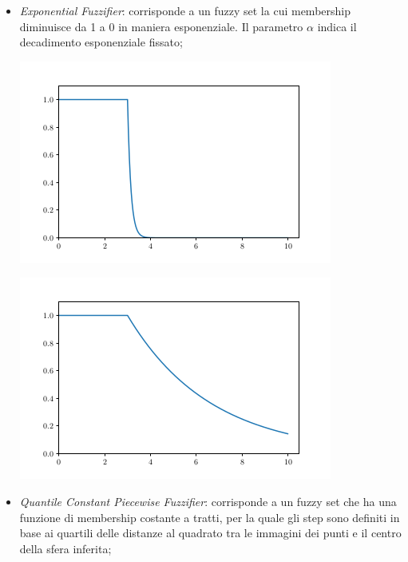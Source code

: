\documentclass[12pt,a4paper]{report}
\begin{document}
\begin{itemize}
\item \emph{Exponential Fuzzifier}: corrisponde a un fuzzy set la cui  membership diminuisce da 1 a 0 in maniera esponenziale. Il parametro $\alpha$ indica il decadimento esponenziale fissato;

\begin{minipage}{\linewidth}
	\centering
       \includegraphics[width=0.8\linewidth]{images/exponentialFuzzifier.png}
\end{minipage}

\begin{minipage}{\linewidth}
	\centering
       \includegraphics[width=0.8\linewidth]{images/exponentialFuzzifier2.png}
\end{minipage}

\item \emph{Quantile Constant Piecewise Fuzzifier}:  corrisponde a un fuzzy set che ha una funzione di membership costante a tratti, per la quale gli step sono definiti in base ai quartili delle distanze al quadrato tra le immagini dei punti e il centro della sfera inferita; 


\end{itemize}
\end{document}

